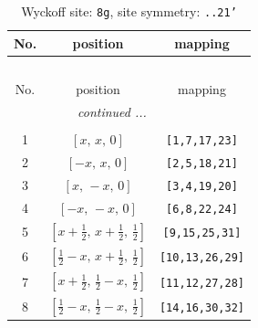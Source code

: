 \documentclass[fleqn,8pt]{jsarticle}
\begin{document}
\renewcommand{\arraystretch}{1.2}
\begin{longtable}{ccc}
\caption{Wyckoff site: {\tt 8g}, site symmetry: {\tt ..21'}}
 \\
 \hline \hline
No. & position & mapping \\ \hline \endfirsthead

\multicolumn{2}{l}{\tablename\ \thetable{}} \\
 \hline \hline
No. & position & mapping \\ \hline \endhead

 \hline \hline
\multicolumn{2}{r}{\footnotesize\it continued ...} \\ \endfoot

 \hline \hline
\multicolumn{2}{r}{} \\ \endlastfoot

1 & $\left[ x,\, x,\, 0 \right]$ & {\tt [1,7,17,23]} \\ \hline
2 & $\left[ - x,\, x,\, 0 \right]$ & {\tt [2,5,18,21]} \\ \hline
3 & $\left[ x,\, - x,\, 0 \right]$ & {\tt [3,4,19,20]} \\ \hline
4 & $\left[ - x,\, - x,\, 0 \right]$ & {\tt [6,8,22,24]} \\ \hline
5 & $\left[ x + \frac{1}{2},\, x + \frac{1}{2},\, \frac{1}{2} \right]$ & {\tt [9,15,25,31]} \\ \hline
6 & $\left[ \frac{1}{2} - x,\, x + \frac{1}{2},\, \frac{1}{2} \right]$ & {\tt [10,13,26,29]} \\ \hline
7 & $\left[ x + \frac{1}{2},\, \frac{1}{2} - x,\, \frac{1}{2} \right]$ & {\tt [11,12,27,28]} \\ \hline
8 & $\left[ \frac{1}{2} - x,\, \frac{1}{2} - x,\, \frac{1}{2} \right]$ & {\tt [14,16,30,32]} \\
\end{longtable}
\renewcommand{\arraystretch}{1.2}
\end{document}
